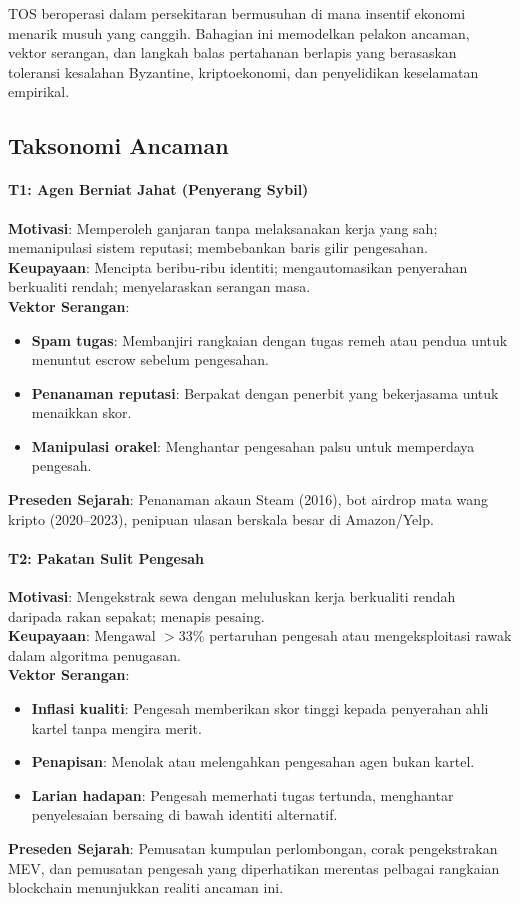 \documentclass[11pt]{article}
\begin{document}
TOS beroperasi dalam persekitaran bermusuhan di mana insentif ekonomi menarik musuh yang canggih. Bahagian ini memodelkan pelakon ancaman, vektor serangan, dan langkah balas pertahanan berlapis yang berasaskan toleransi kesalahan Byzantine, kriptoekonomi, dan penyelidikan keselamatan empirikal.

\subsection{Taksonomi Ancaman}

\paragraph{T1: Agen Berniat Jahat (Penyerang Sybil)}
\textbf{Motivasi}: Memperoleh ganjaran tanpa melaksanakan kerja yang sah; memanipulasi sistem reputasi; membebankan baris gilir pengesahan.\\
\textbf{Keupayaan}: Mencipta beribu-ribu identiti; mengautomasikan penyerahan berkualiti rendah; menyelaraskan serangan masa.\\
\textbf{Vektor Serangan}:
\begin{itemize}[noitemsep]
  \item \textbf{Spam tugas}: Membanjiri rangkaian dengan tugas remeh atau pendua untuk menuntut escrow sebelum pengesahan.
  \item \textbf{Penanaman reputasi}: Berpakat dengan penerbit yang bekerjasama untuk menaikkan skor.
  \item \textbf{Manipulasi orakel}: Menghantar pengesahan palsu untuk memperdaya pengesah.
\end{itemize}
\textbf{Preseden Sejarah}: Penanaman akaun Steam (2016), bot airdrop mata wang kripto (2020--2023), penipuan ulasan berskala besar di Amazon/Yelp.

\paragraph{T2: Pakatan Sulit Pengesah}
\textbf{Motivasi}: Mengekstrak sewa dengan meluluskan kerja berkualiti rendah daripada rakan sepakat; menapis pesaing.\\
\textbf{Keupayaan}: Mengawal $>33\%$ pertaruhan pengesah atau mengeksploitasi rawak dalam algoritma penugasan.\\
\textbf{Vektor Serangan}:
\begin{itemize}[noitemsep]
  \item \textbf{Inflasi kualiti}: Pengesah memberikan skor tinggi kepada penyerahan ahli kartel tanpa mengira merit.
  \item \textbf{Penapisan}: Menolak atau melengahkan pengesahan agen bukan kartel.
  \item \textbf{Larian hadapan}: Pengesah memerhati tugas tertunda, menghantar penyelesaian bersaing di bawah identiti alternatif.
\end{itemize}
\textbf{Preseden Sejarah}: Pemusatan kumpulan perlombongan, corak pengekstrakan MEV, dan pemusatan pengesah yang diperhatikan merentas pelbagai rangkaian blockchain menunjukkan realiti ancaman ini.
\end{document}
